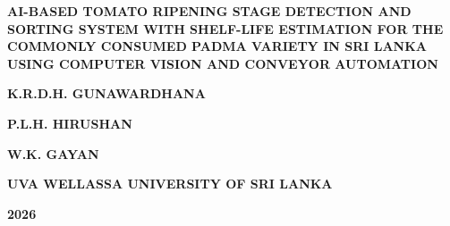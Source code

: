 \begin{titlepage}
    \centering
    \thispagestyle{empty}

    \vspace*{1.5cm}

    \begin{minipage}{0.85\textwidth}
        \centering
        \textbf{\large AI-BASED TOMATO RIPENING STAGE DETECTION AND
        SORTING SYSTEM WITH SHELF-LIFE ESTIMATION FOR THE
        COMMONLY CONSUMED PADMA VARIETY IN SRI LANKA USING
        COMPUTER VISION AND CONVEYOR AUTOMATION}
    \end{minipage}

    \vfill

    \textbf{\large K.R.D.H. GUNAWARDHANA}

    \textbf{\large P.L.H. HIRUSHAN}

    \textbf{\large W.K. GAYAN}

    \vfill

    \textbf{\large UVA WELLASSA UNIVERSITY OF SRI LANKA}

    \vspace{0.5cm}

    \textbf{\large {} 2026}

\end{titlepage}
\addtocounter{page}{-1}
